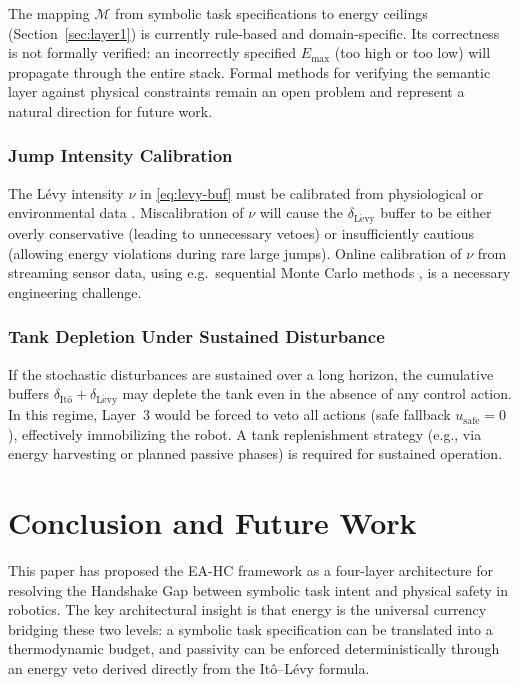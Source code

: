 \documentclass[11pt]{article}
\begin{document}
The mapping $\mathcal{M}$ from symbolic task specifications to energy ceilings
(Section~\ref{sec:layer1}) is currently rule-based and domain-specific. Its correctness is not
formally verified: an incorrectly specified $E_{\max}$ (too high or too low) will propagate
through the entire stack. Formal methods for verifying the semantic layer against physical
constraints \cite{pnueli1989,seshia2018} remain an open problem and represent a natural
direction for future work.

\subsubsection{Jump Intensity Calibration}

The L\'{e}vy intensity $\nu$ in \eqref{eq:levy-buf} must be calibrated from physiological or
environmental data \cite{cont2004,ku1997}. Miscalibration of $\nu$ will cause the
$\delta_{\mathrm{L\acute{e}vy}}$ buffer to be either overly conservative (leading to
unnecessary vetoes) or insufficiently cautious (allowing energy violations during rare large
jumps). Online calibration of $\nu$ from streaming sensor data, using e.g.\ sequential Monte
Carlo methods \cite{doucet2001}, is a necessary engineering challenge.

\subsubsection{Tank Depletion Under Sustained Disturbance}

If the stochastic disturbances are sustained over a long horizon, the cumulative buffers
$\delta_{\mathrm{It\hat{o}}}+\delta_{\mathrm{L\acute{e}vy}}$ may deplete the tank even in the
absence of any control action. In this regime, Layer~3 would be forced to veto all actions
(safe fallback $u_{\mathrm{safe}}=0$), effectively immobilizing the robot. A tank replenishment
strategy (e.g., via energy harvesting or planned passive phases) is required for sustained
operation.

\section{Conclusion and Future Work}
\label{sec:conclusion}

This paper has proposed the EA-HC framework as a four-layer architecture for resolving the
Handshake Gap between symbolic task intent and physical safety in robotics. The key
architectural insight is that energy is the universal currency bridging these two levels: a
symbolic task specification can be translated into a thermodynamic budget, and passivity can
be enforced deterministically through an energy veto derived directly from the It\^{o}--L\'{e}vy
formula.
\end{document}
